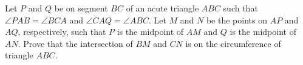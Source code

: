 Let 
$P$
 and 
$Q$
 be on segment 
$BC$
 of an acute triangle 
$ABC$
 such that 
$\angle PAB=\angle BCA$
 and 
$\angle CAQ=\angle ABC$.
 Let 
$M$
 and 
$N$
 be the points on 
$AP$
 and 
$AQ$, 
 respectively, such that 
$P$
 is the midpoint of 
$AM$
 and 
$Q$
 is the midpoint of 
$AN$.
 Prove that the intersection of 
$BM$
 and 
$CN$
 is on the circumference of triangle 
$ABC$.
